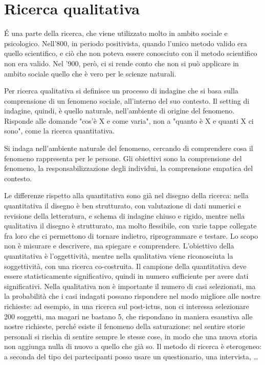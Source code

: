 \chapter{Ricerca qualitativa}
\'E una parte della ricerca, che viene utilizzato molto in ambito sociale e psicologico. Nell'800, in periodo positivista, quando l'unico metodo valido era quello scientifico, e ciò che non poteva essere conosciuto con il metodo scientifico non era valido. Nel '900, però, ci si rende conto che non si può applicare in ambito sociale quello che è vero per le scienze naturali.

Per ricerca qualitativa si definisce un processo di indagine che si basa sulla comprensione di un fenomeno sociale, all'interno del suo contesto. Il setting di indagine, quindi, è quello naturale, nell'ambiente di origine del fenomeno. Risponde alle domande "cos'è X e come varia", non a "quanto è X e quanti X ci sono", come la ricerca quantitativa.

Si indaga nell'ambiente naturale del fenomeno, cercando di comprendere cosa il fenomeno rappresenta per le persone. Gli obiettivi sono la comprensione del fenomeno, la responsabilizzazione degli individui, la comprensione empatica del contesto.

Le differenze rispetto alla quantitativa sono già nel disegno della ricerca: nella quantitativa il disegno è ben strutturato, con valutazione di dati numerici e revisione della letteratura, e schema di indagine chiuso e rigido, mentre nella qualitativa il disegno è strutturato, ma molto flessibile, con varie tappe collegate fra loro che ci permettono di tornare indietro, riprogrammare e testare. Lo scopo non è misurare e descrivere, ma spiegare e comprendere.
L'obiettivo della quantitativa è l'oggettività, mentre nella qualitativa viene riconosciuta la soggettività, con una ricerca co-costruita.
Il campione della quantitativa deve essere statisticamente significativo, quindi in numero sufficiente per avere dati significativi. Nella qualitativa non è importante il numero di casi selezionati, ma la probabilità che i casi indagati possano rispondere nel modo migliore alle nostre richieste: ad esempio, in una ricerca sul post-ictus, non ci interessa selezionare 200 soggetti, ma magari ne bastano 5, che rispondano in maniera esaustiva alle nostre richieste, perché esiste il fenomeno della saturazione: nel sentire storie personali si rischia di sentire sempre le stesse cose, in modo che una nuova storia non aggiunga nulla di nuovo a quello che già so.
Il metodo di ricerca è eterogeneo: a seconda del tipo dei partecipanti posso usare un questionario, una intervista, \dots

